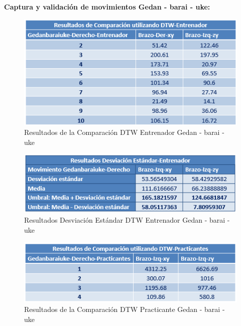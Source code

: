 \clearpage
\textbf{Captura y validación de movimientos Gedan - barai - uke:}\\
\begin{figure}[H]%
	\begin{center}
		\includegraphics[scale=1]{./Figuras/Implementacion/Pruebas/Tablas/ResultadosDTW_Entrenador_Gedanbaraiuke}
	\end{center}
	\caption{Resultados de la Comparación DTW Entrenador Gedan - barai - uke}
	\label{fig:ResultadosDTW_Entrenador_Gedanbaraiuke}
\end{figure}
\begin{figure}[H]%
	\begin{center}
		\includegraphics[scale=1]{./Figuras/Implementacion/Pruebas/Tablas/ResultadorDesvEstandar_Entrenador_Gedanbaraiuke}
	\end{center}
	\caption{Resultados Desviación Estándar DTW Entrenador Gedan - barai - uke}
	\label{fig:ResultadorDesvEstandar_Entrenador_Gedanbaraiuke}
\end{figure}
\begin{figure}[H]%
	\begin{center}
		\includegraphics[scale=1]{./Figuras/Implementacion/Pruebas/Tablas/ResultadosDTW_Practicante_Gedanbaraiuke}
	\end{center}
	\caption{Resultados de la Comparación DTW Practicante Gedan - barai - uke}
	\label{fig:ResultadosDTW_Practicante_Gedanbaraiuke}
\end{figure}
